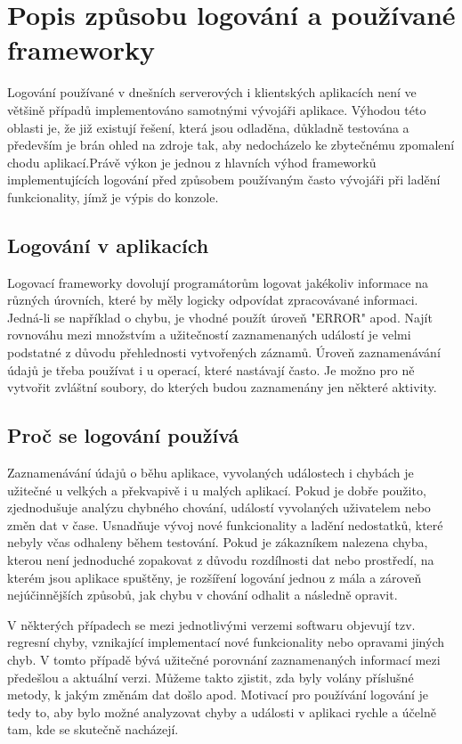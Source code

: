 \documentclass[ing,male,java,dept460]{diploma}		%
\begin{document}
\section{Popis způsobu logování a používané frameworky}
\label{sec:AboutLogging}
Logování používané v dnešních serverových i klientských aplikacích není ve většině případů implementováno samotnými vývojáři aplikace. Výhodou této oblasti je, že již existují řešení, která jsou odladěna, důkladně testována a především je brán ohled na zdroje tak, aby nedocházelo ke zbytečnému zpomalení chodu aplikací.Právě výkon je jednou z hlavních výhod frameworků implementujících logování před způsobem používaným často vývojáři při ladění funkcionality, jímž je výpis do konzole.

\subsection{Logování v aplikacích}
Logovací frameworky dovolují programátorům logovat jakékoliv informace na různých úrovních, které by měly logicky odpovídat zpracovávané informaci. Jedná-li se například o chybu, je vhodné použít úroveň "ERROR" apod. Najít rovnováhu mezi množstvím a užitečností zaznamenaných událostí je velmi podstatné z důvodu přehlednosti vytvořených záznamů. Úroveň zaznamenávání údajů je třeba používat i u operací, které nastávají často. Je možno pro ně vytvořit zvláštní soubory, do kterých budou zaznamenány jen některé aktivity.

\subsection{Proč se logování používá}
Zaznamenávání údajů o běhu aplikace, vyvolaných událostech i chybách je užitečné u velkých a překvapivě i u malých aplikací. Pokud je dobře použito, zjednodušuje analýzu chybného chování, událostí vyvolaných uživatelem nebo změn dat v čase. Usnadňuje vývoj nové funkcionality a ladění nedostatků, které nebyly včas odhaleny během testování. Pokud je zákazníkem nalezena chyba, kterou není jednoduché zopakovat z důvodu rozdílnosti dat nebo prostředí, na kterém jsou aplikace spuštěny, je rozšíření logování jednou z mála a zároveň nejúčinnějších způsobů, jak chybu v chování odhalit a následně opravit. 
\par V některých případech se mezi jednotlivými verzemi softwaru objevují tzv. regresní chyby, vznikající implementací nové funkcionality nebo opravami jiných chyb. V tomto případě bývá užitečné porovnání zaznamenaných informací mezi předešlou a aktuální verzi. Můžeme takto zjistit, zda byly volány příslušné metody, k jakým změnám dat došlo apod. Motivací pro používání logování je tedy to, aby bylo možné analyzovat chyby a události v aplikaci rychle a účelně tam, kde se skutečně nacházejí.
\end{document}
